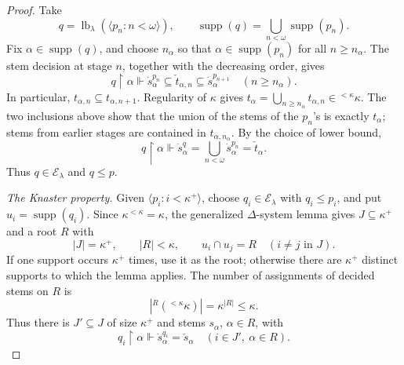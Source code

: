 \documentclass[10pt,a4paper]{amsart}
\theoremstyle{definition}
\theoremstyle{remark}
\DeclareMathOperator{\supp}{supp}
\begin{document}
\begin{proof}
Take
\[
 q=\operatorname{lb}_\lambda(\langle p_n:n<\omega\rangle),
 \qquad \supp(q)=\bigcup_{n<\omega}\supp(p_n).
\]
Fix \(\alpha\in\supp(q)\), and choose \(n_\alpha\) so
that \(\alpha\in\supp(p_n)\) for all \(n\geq n_\alpha\).
The stem decision at stage \(n\), together with the decreasing order,
gives
\[
 q\restriction\alpha\Vdash
 \dot s_\alpha^{p_n}\subseteq\check t_{\alpha,n}
                     \subseteq\dot s_\alpha^{p_{n+1}}
                               \quad(n\geq n_\alpha).
\]
In particular, \(t_{\alpha,n}\subseteq t_{\alpha,n+1}\).
Regularity of \(\kappa\) gives
\(t_\alpha=\bigcup_{n\geq n_\alpha}t_{\alpha,n}
\in{}^{<\kappa}\kappa\). The two inclusions above show that
the union of the stems of the \(p_n\)'s is exactly
\(t_\alpha\); stems from earlier stages are contained in
\(t_{\alpha,n_\alpha}\). By the choice of lower bound,
\[
 q\restriction\alpha\Vdash
 \dot s_\alpha^q=\bigcup_{n<\omega}\dot s_\alpha^{p_n}
                                      =\check t_\alpha.
\]
Thus \(q\in\mathcal E_\lambda\) and \(q\leq p\).

\emph{The Knaster property.}
Given \(\langle p_i:i<\kappa^+\rangle\), choose
\(q_i\in\mathcal E_\lambda\) with \(q_i\leq p_i\),
and put \(u_i=\supp(q_i)\). Since
\(\kappa^{<\kappa}=\kappa\), the generalized
\(\Delta\)-system lemma gives \(J\subseteq\kappa^+\)
and a root \(R\) with
\[
 |J|=\kappa^+,\qquad |R|<\kappa,\qquad
 u_i\cap u_j=R\quad(i\neq j\text{ in }J).
\]
If one support occurs \(\kappa^+\) times, use it as the root;
otherwise there are \(\kappa^+\) distinct supports to which the
lemma applies. The number of assignments
of decided stems on \(R\) is
\[
 \left|{}^R({}^{<\kappa}\kappa)\right|
                              =\kappa^{|R|}\leq\kappa.
\]
Thus there is \(J'\subseteq J\) of size \(\kappa^+\)
and stems \(s_\alpha\), \(\alpha\in R\), with
\[
 q_i\restriction\alpha\Vdash
                      \dot s_\alpha^{q_i}=\check s_\alpha
                              \quad(i\in J',\ \alpha\in R).
\]


\end{proof}
\end{document}

